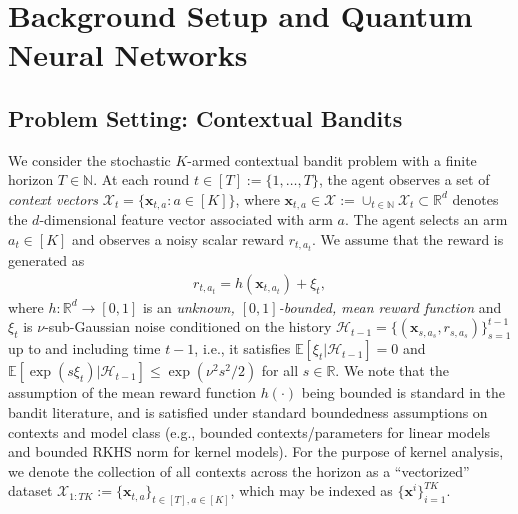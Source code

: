 \documentclass[pdflatex,sn-mathphys-num]{sn-jnl}%
\theoremstyle{thmstyleone}%
\theoremstyle{thmstyletwo}%
\theoremstyle{thmstylethree}%
\newcommand{\R}{\mathbb{R}}
\newcommand{\xbf}{\mathbf{x}}
\begin{document}
 


























\section{Background Setup and Quantum Neural Networks}\label{sec2}

\subsection{Problem Setting: Contextual Bandits}
We consider the stochastic $K$-armed contextual bandit problem with a finite horizon $T \in \mathbb{N}$. 
At each round $t \in [T] := \{1, \dots, T\}$, the agent observes a set of {\em context vectors} $\mathcal{X}_t = \{\xbf_{t,a}: a \in [K]\}$, where $\xbf_{t,a} \in \mathcal X := \cup_{t\in \mathbb{N}}\mathcal{X}_t \subset \mathbb R^d$ denotes the $d$-dimensional feature vector associated with arm $a$.
The agent selects an arm $a_t \in [K]$ and observes a noisy scalar reward $r_{t, a_t}$. We assume that the reward is generated as
\begin{align}
    r_{t,a_t}=h(\xbf_{t,a_t})+ \xi_t, \label{eq:reward}
\end{align} where $h: \mathbb{R}^d \to [0, 1]$ is an \textit{unknown, $[0,1]$-bounded, mean reward function}  and   $\xi_t$ is $\nu$-sub-Gaussian noise conditioned on the history  $\mathcal{H}_{t-1} = \{(\xbf_{s, a_s}, r_{s, a_s})\}_{s=1}^{t-1}$  up to and including time $t-1$, i.e., it  satisfies $\mathbb{E}[\xi_t| \mathcal{H}_{t-1}]=0$ and $\mathbb{E}[\exp(s\xi_t)|\mathcal{H}_{t-1}]\le \exp(\nu^2s^2/2)$ for all $s\in\R$. We note that the assumption of the mean reward function $h(\cdot)$ being bounded is standard in the bandit literature, and is satisfied under standard boundedness assumptions on contexts and model class (e.g., bounded contexts/parameters for linear models and bounded RKHS norm for kernel models). %
For the purpose of kernel analysis, we denote the collection of all contexts across the horizon as a ``vectorized'' dataset $\mathcal{X}_{1:TK} := \{\xbf_{t,a}\}_{t \in [T], a \in [K]}$, which may be indexed as $\{\xbf^i\}_{i=1}^{TK}$.
\end{document}
